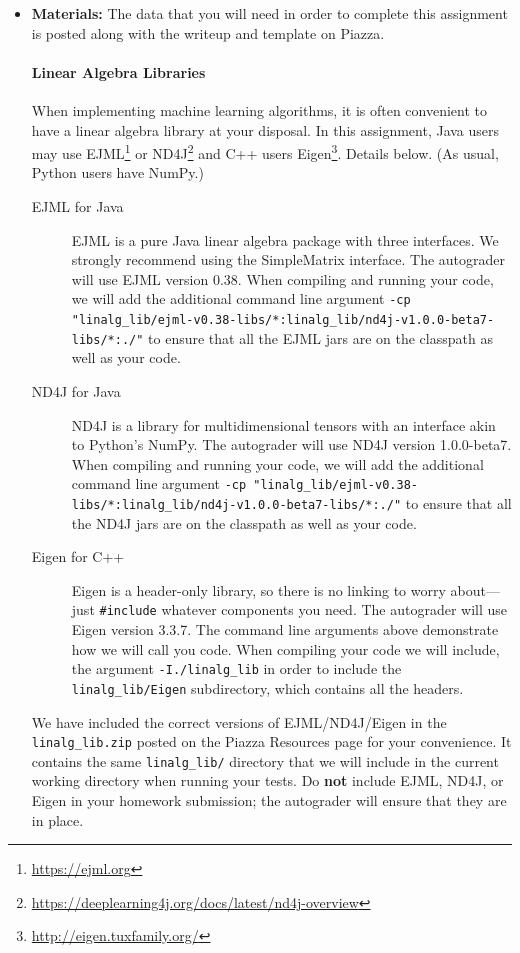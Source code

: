 \documentclass[11pt,addpoints,answers]{exam}
\begin{document}
\begin{itemize}
\begin{itemize}
  \end{itemize}

\item \textbf{Materials:} The data that you will need in order to complete this assignment is posted along with the writeup and template on Piazza.

\begin{notebox}
\paragraph{Linear Algebra Libraries} When implementing machine learning algorithms, it is often convenient to have a linear algebra library at your disposal. In this assignment, Java users may use EJML\footnote{\url{https://ejml.org}} or ND4J\footnote{\url{https://deeplearning4j.org/docs/latest/nd4j-overview}} and C++ users Eigen\footnote{\url{http://eigen.tuxfamily.org/}}. Details below. 
%
(As usual, Python users have NumPy.)
%
\begin{description}
\item[EJML for Java] EJML is a pure Java linear algebra package with three interfaces. We strongly recommend using the SimpleMatrix interface. The autograder will use EJML version 0.38. When compiling and running your code, we will add the additional command line argument \small{\lstinline{-cp "linalg_lib/ejml-v0.38-libs/*:linalg_lib/nd4j-v1.0.0-beta7-libs/*:./"}}
to ensure that all the EJML jars are on the classpath as well as your code. 

\item[ND4J for Java] ND4J is a library for multidimensional tensors with an interface akin to Python's NumPy. The autograder will use ND4J version 1.0.0-beta7. When compiling and running your code, we will add the additional command line argument \small{\lstinline{-cp "linalg_lib/ejml-v0.38-libs/*:linalg_lib/nd4j-v1.0.0-beta7-libs/*:./"}} to ensure that all the ND4J jars are on the classpath as well as your code. 

\item[Eigen for C++] Eigen is a header-only library, so there is no linking to worry about---just \lstinline{#include} whatever components you need. The autograder will use Eigen version 3.3.7. The command line arguments above demonstrate how we will call you code. When compiling your code we will include, the argument \lstinline{-I./linalg_lib} in order to include the \lstinline{linalg_lib/Eigen} subdirectory, which contains all the headers.

\end{description} 
We have included the correct versions of EJML/ND4J/Eigen in the \lstinline{linalg_lib.zip} posted on the Piazza Resources page for your convenience. It contains the same \lstinline{linalg_lib/} directory that we will include in the current working directory when running your tests. Do {\bf not} include EJML, ND4J, or Eigen in your homework submission; the autograder will ensure that they are in place. 
\end{notebox}

\end{itemize}
\clearpage
\end{document}
